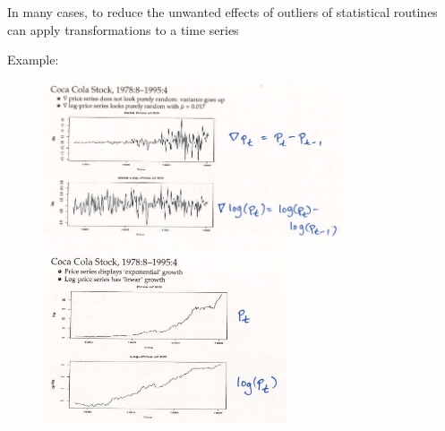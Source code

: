 In many cases, to reduce the unwanted effects of outliers of statistical routines can apply transformations to a time series

Example:

\begin{figure}[htbp]
  \centering
  \begin{minipage}{0.49\textwidth}
    \includegraphics[height=5cm]{images/Screenshot 2024-03-30 at 17.45.04.jpg} %
  \end{minipage}\hfill
  \begin{minipage}{0.49\textwidth}
    \includegraphics[height=5cm]{images/Screenshot 2024-03-30 at 17.46.58.jpg} %
  \end{minipage}
\end{figure}



